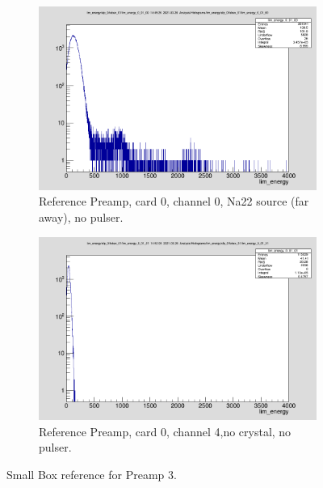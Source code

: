 \documentclass{report}
\begin{document}
\begin{figure}[!htb]
  \centering
  \begin{subfigure}[b]{0.45\textwidth}
    \includegraphics[width=\linewidth]{preamp3_ref_ch0.png}
          \caption{Reference Preamp, card 0, channel 0, Na22 source (far away), no pulser.}
  \end{subfigure}
  \begin{subfigure}[b]{0.4\textwidth}
    \includegraphics[width=\linewidth]{preamp3_ref_ch1_no_crystal.png}
    \caption{Reference Preamp, card 0, channel 4,no crystal, no pulser.}
  \end{subfigure}
  \caption{Small Box reference for Preamp 3.}
\end{figure}
\newpage
\clearpage
\end{document}
